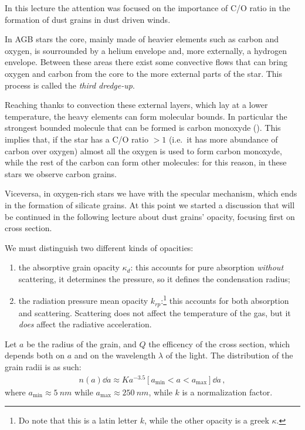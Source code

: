 \documentclass[main.tex]{subfiles}
\begin{document}
In this lecture the attention was focused on the importance of C/O ratio in the formation of dust grains in dust driven winds. 

In AGB stars the core, mainly made of heavier elements such as carbon and oxygen, is sourrounded by a helium envelope and, more externally, a hydrogen envelope. 
Between these areas there exist some convective flows that can bring oxygen and carbon from the core to the more external parts of the star. 
This process is called the \emph{third dredge-up}.

Reaching thanks to convection these external layers, which lay at a lower temperature, the heavy elements can form molecular bounds.
In particular the strongest bounded molecule that can be formed is carbon monoxyde ().
This implies that, if the star has a C/O ratio $>1$ (i.e.\ it has more abundance of carbon over oxygen) almost all the oxygen is used to form carbon monoxyde, while the rest of the carbon can form other molecules: for this reason, in these stars we observe carbon grains.

Viceversa, in oxygen-rich stars we have with the specular mechanism, which ends in the formation of silicate grains.
At this point we started a discussion that will be continued in the following lecture about dust grains' opacity, focusing first on cross section.

We must distinguish two different kinds of opacities: 
\begin{enumerate}
  \item the absorptive grain opacity \(\kappa_{d}\): this accounts for pure absorption \emph{without} scattering, it determines the pressure, so it defines the condensation radius;
  \item the radiation pressure mean opacity \(k_{rp}\):\footnote{Do note that this is a latin letter \(k\), while the other opacity is a greek \(\kappa \).} this accounts for both absorption and scattering. Scattering does not affect the temperature of the gas, but it \emph{does} affect the radiative acceleration.
\end{enumerate}

Let $a$ be the radius of the grain, and $Q$ the efficency of the cross section, which depends both on \(a\) and on the wavelength \(\lambda \) of the light.
The distribution of the grain radii is as such: 
%
\begin{align}
n(a) \dd{a} \approx K a^{-3.5} [a _{\text{min}} < a < a _{\text{max}} ] \dd{a}
\,,
\end{align}
%
where \(a _{\text{min}} \approx \SI{5}{nm}\) while \(a _{\text{max}} \approx \SI{250}{nm}\), while \(k\) is a normalization factor.
\end{document}
